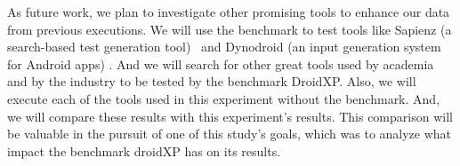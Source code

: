 As future work, we plan to investigate other promising tools to enhance our data from previous executions. We will use the benchmark to test tools like Sapienz (a search-based test generation tool)~\cite{DBLP:conf/issta/MaoHJ16} and Dynodroid (an input generation system for Android apps) \cite{DBLP:conf/sigsoft/MachiryTN13}. And we will search for other great tools used by academia and by the industry to be tested by the benchmark DroidXP.
Also, we will execute each of the tools used in this experiment without the benchmark. And, we will compare these results with this experiment's results. This comparison will be valuable in the pursuit of one of this study's goals, which was to analyze what impact the benchmark droidXP has on its results.
